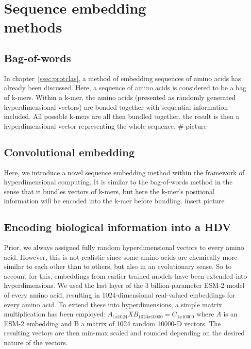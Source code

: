 \chapter[Sequence embedding methods]{Sequence embedding\\methods}

\section{Bag-of-words}
In chapter~\ref{ssec:protclas}, a method of embedding sequences of amino acids has already been discussed. Here, a sequence of amino acids is considered to be a bag of k-mers. Within a k-mer, the amino acids (presented as randomly generated hyperdimensional vectors) are bonded together with sequential information included. All possible k-mers are all then bundled together, the result is then a hyperdimensional vector representing the whole sequence.
\# picture

\section{Convolutional embedding}
Here, we introduce a novel sequence embedding method within the framework of hyperdimensional computing. It is similar to the bag-of-words method in the sense that it bundles vectors of k-mers, but here the k-mer's positional information will be encoded into the k-mer before bundling. insert picture

\section{Encoding biological information into a HDV}
Prior, we always assigned fully random hyperdimensional vectors to every amino acid. However, this is not realistic since some amino acids are chemically more similar to each other than to others, but also in an evolutionary sense. So to account for this, embeddings from earlier trained models have been extended into hyperdimensions. We used the last layer of the 3 billion-parameter ESM-2 model~\cite{esm2} of every amino acid, resulting in 1024-dimensional real-valued embeddings for every amino acid. To extend these into hyperdimensions, a simple matrix multiplication has been employed: $A_{1x1024}X B_{1024x10000} = C_{1x10000}$ where $A$ is an ESM-2 embedding and B a matrix of 1024 random 10000-D vectors. The resulting vectors are then min-max scaled and rounded depending on the desired nature of the vectors.
